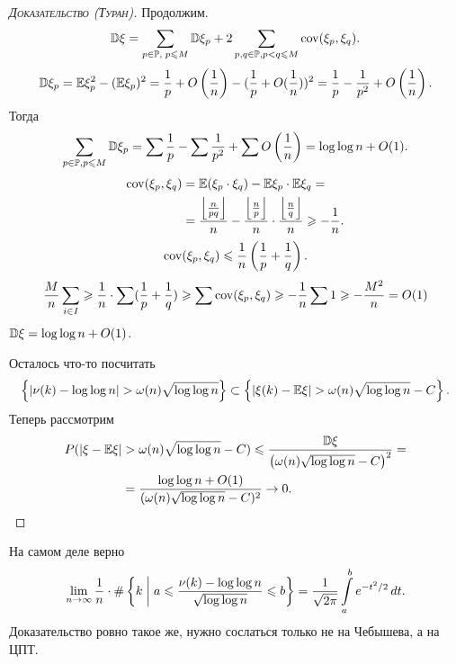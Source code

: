 \documentclass[../main.tex]{subfiles}
\begin{document}
\begin{proof}[\normalfont\textsc{Доказательство (Туран)}]
 Продолжим.
 \begin{align*}
  \mathbb D\xi = \sum_{p \in \mathbb P,\; p \leqslant M} \mathbb D\xi_p + 2 \sum_{p,q \in \mathbb P,p < q \leqslant M} \mathrm{cov}(\xi_p,\xi_q).
 \end{align*}
 \begin{align*}
  \mathbb D\xi_p = \mathbb E\xi_p^{2} - (\mathbb E\xi_p)^{2} = \frac{1}{p} + O \left( \frac{1}{n} \right) - (\frac{1}{p} + O(\frac{1}{n}))^{2} = \frac{1}{p} - \frac{1}{p^{2}} + O \left( \frac{1}{n} \right).
 \end{align*} Тогда
 \begin{align*}
  \sum_{p \in \mathbb P, p \leqslant M} \mathbb D\xi_p = \sum \frac{1}{p} - \sum \frac{1}{p^{2}} + \sum O \left( \frac{1}{n} \right) = \log\log n + O(1).
 \end{align*}
 \begin{align*}
  \mathrm{cov}(\xi_p, \xi_q) &= \mathbb E(\xi_p \cdot \xi_q) - \mathbb E\xi_p \cdot \mathbb E\xi_q = \\
  &= \frac{\left\lfloor \frac{n}{pq} \right\rfloor }{n} - \frac{\left\lfloor \frac{n}{p} \right\rfloor}{n} \cdot \frac{\left\lfloor \frac{n}{q} \right\rfloor }{n} \geqslant -\frac{1}{n}.
 \end{align*} 
  \begin{align*}
   \mathrm{cov}(\xi_p, \xi_q) \leqslant \frac{1}{n}\left(\frac{1}{p} + \frac{1}{q}\right).
  \end{align*} 
  \begin{align*}
   \frac{M}{n} \sum_{i \in I} \geqslant \frac{1}{n} \cdot \sum (\frac{1}{p} + \frac{1}{q}) \geqslant \sum \mathrm{cov}(\xi_p, \xi_q) \geqslant -\frac{1}{n} \sum 1 \geqslant -\frac{M^{2}}{n} = O(1)
  \end{align*} 
  $ \mathbb D\xi = \log\log n + O(1) $.

  Осталось что-то посчитать
  \begin{align*}
   \left\{\left| \nu(k) - \log\log n \right| > \omega(n) \sqrt{\log\log n} \right\} \subset \left\{ \left|\xi(k) - \mathbb E\xi \right| > \omega(n)\sqrt{\log\log n} - C \right\}.
  \end{align*} Теперь рассмотрим
  \begin{align*}
   P( \left| \xi - \mathbb E\xi \right| &> \omega(n)\sqrt{\log\log n} - C) \leqslant \frac{\mathbb D\xi}{\left( \omega(n)\sqrt{\log \log n} - C \right)^{2}} = \\
   &= \frac{\log\log n + O(1)}{(\omega(n)\sqrt{\log \log n} - C)^{2}} \to 0.
  \end{align*} 
\end{proof}
\begin{remrk}
 На самом деле верно
 \begin{align*}
  \lim_{n \to \infty} \frac{1}{n} \cdot \# \left\{ k \;\middle|\; a \leqslant \frac{\nu(k)- \log\log n}{\sqrt{\log \log n}} \leqslant b \right\} = \frac{1}{\sqrt{2\pi}} \int\limits_{a}^{b} e^{-t^{2} / 2}\,dt.
 \end{align*} Доказательство ровно такое же, нужно сослаться только не на Чебышева, а на ЦПТ.
\end{remrk}
\end{document}
